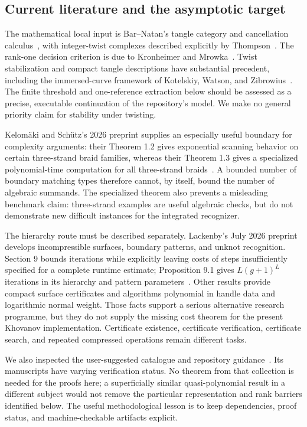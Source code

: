 \subsection{Current literature and the asymptotic target}

The mathematical local input is Bar--Natan's tangle category and
cancellation calculus~\cite{bn05,bn07}, with integer-twist complexes
described explicitly by Thompson~\cite{thompson}. The rank-one decision
criterion is due to Kronheimer and Mrowka~\cite{km}.
Twist stabilization and compact tangle descriptions have substantial
precedent, including the immersed-curve framework of Kotelskiy, Watson,
and Zibrowius~\cite{kwz}. The finite threshold and one-reference extraction
below should be assessed as a precise, executable continuation of the
repository's model. We make no general priority claim for stability under
twisting.

Kelom\"aki and Sch\"utz's 2026 preprint supplies an especially useful
boundary for complexity arguments: their Theorem 1.2 gives exponential
scanning behavior on certain three-strand braid families, whereas their
Theorem 1.3 gives a specialized polynomial-time computation for all
three-strand braids~\cite{ks26}. A bounded number of boundary matching
types therefore cannot, by itself, bound the number of algebraic summands.
The specialized theorem also prevents a misleading benchmark claim:
three-strand examples are useful algebraic checks, but do not demonstrate
new difficult instances for the integrated recognizer.

The hierarchy route must be described separately. Lackenby's July 2026
preprint develops incompressible surfaces, boundary patterns, and unknot
recognition. Section 9 bounds iterations while explicitly leaving costs
of steps insufficiently specified for a complete runtime estimate;
Proposition 9.1 gives \(L(g+1)^L\) iterations in its hierarchy and pattern
parameters~\cite{lackenby26}. Other results provide compact surface
certificates and algorithms polynomial in handle data and logarithmic
normal weight. Those facts support a serious alternative research
programme, but they do not supply the missing cost theorem for the present
Khovanov implementation. Certificate existence, certificate verification,
certificate search, and repeated compressed operations remain different
tasks.

We also inspected the user-suggested  catalogue and
repository guidance~\cite{openaimath}. Its manuscripts have varying
verification status. No theorem from that collection is needed for the
proofs here; a superficially similar quasi-polynomial result in a different
subject would not remove the particular representation and rank barriers
identified below. The useful methodological lesson is to keep dependencies,
proof status, and machine-checkable artifacts explicit.


